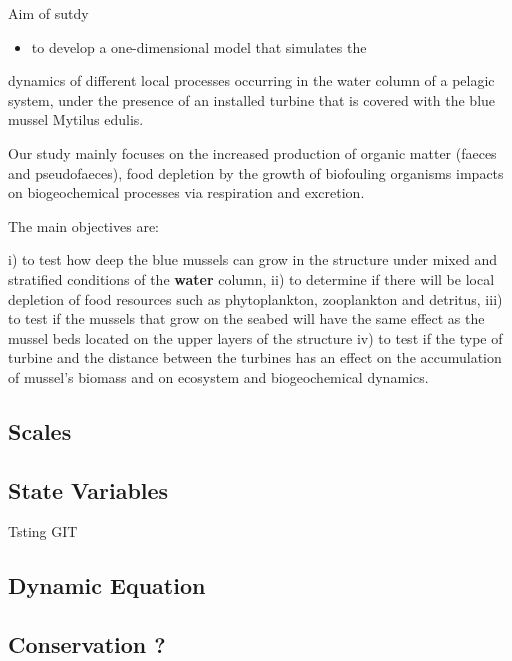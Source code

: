 \documentclass[final,xcolor=dvipsnames]{beamer}
\begin{document}
\begin{frame}
\begin{block}{Aim of sutdy}
\begin{itemize}
    \item to develop a one-dimensional model that simulates the
\end{itemize} 
dynamics of different local processes occurring in the water column of a pelagic
system, under the presence of an installed turbine that is covered with the blue
mussel Mytilus edulis.

Our study mainly focuses on
the increased production of organic matter (faeces and pseudofaeces),
food depletion by the growth of biofouling organisms
impacts on biogeochemical processes via respiration and excretion. 

The main objectives are: 

i) to test how deep the blue mussels can grow in the structure under mixed and stratified conditions of the \textbf<2>{water} column,
ii) to determine if there will be local depletion of food resources
such as phytoplankton, zooplankton and detritus,
iii) to test if the mussels that grow on the seabed will have the same effect as the mussel beds located on the upper layers of the structure iv) to test if the type of turbine and the distance between the turbines has an effect on the accumulation of mussel’s biomass and on ecosystem and biogeochemical dynamics.
\end{block}
\end{frame}

\subsection{Scales}



\subsection{State Variables}

\begin{frame}
 Tsting GIT
\end{frame}

\subsection{Dynamic Equation}
\subsection{Conservation ?}
\end{document}
